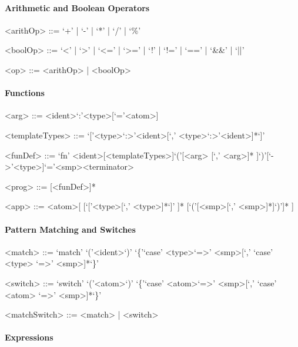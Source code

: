 \documentclass[11pt]{article} %
\begin{document}
\paragraph{Arithmetic and Boolean Operators}

\begin{grammar}

<arithOp> ::= `+' | `-' | `*' | `/' | `\%'

<boolOp> ::= `<' | `>' | `<=' | `>=' | `!' | `!=' | `==' | `\&\&' | `||'

<op> ::= <arithOp> | <boolOp> 

\end{grammar}

\paragraph{Functions}

\begin{grammar}

<arg> ::= <ident>`:'<type>[`='<atom>]

<templateTypes> ::= `['<type>`:>'<ident>[`,' <type>`:>'<ident>]*`]'

<funDef> ::= `fn' <ident>[<templateTypes>]`('[<arg> [`,' <arg>]* ]`)'[`->'<type>]`='<smp><terminator>

<prog> ::= [<funDef>]*

<app> ::= <atom>[ [`['<type>[`,' <type>]*`]' ]* [`('[<smp>[`,' <smp>]*]`)']* ]

\end{grammar}

\paragraph{Pattern Matching and Switches}

\begin{grammar}

<match> ::= `match' `('<ident>`)' `\{'`case' <type>`=>' <smp>[`,' `case' <type> `=>' <smp>]*`\}'

<switch> ::= `switch' `('<atom>`)' `\{'`case' <atom>`=>' <smp>[`,' `case' <atom> `=>' <smp>]*`\}'

<matchSwitch> ::= <match> | <switch>

\end{grammar}

\paragraph{Expressions}
\end{document}
